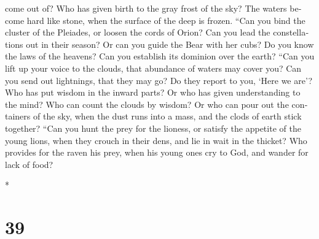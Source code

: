 \begin{paracol}{2}
\begin{otherlanguage}{english}
come out of? Who has given birth to the gray frost of the sky?
 The waters become hard like stone, when the surface of
the deep is frozen.  ``Can you bind the cluster of the
Pleiades, or loosen the cords of Orion?  Can you lead the
constellations out in their season? Or can you guide the Bear with her
cubs?  Do you know the laws of the heavens? Can you
establish its dominion over the earth?  ``Can you lift up
your voice to the clouds, that abundance of waters may cover you?
 Can you send out lightnings, that they may go? Do they
report to you, `Here we are'?  Who has put wisdom in the
inward parts? Or who has given understanding to the mind?
 Who can count the clouds by wisdom? Or who can pour out
the containers of the sky,  when the dust runs into a
mass, and the clods of earth stick together?  ``Can you
hunt the prey for the lioness, or satisfy the appetite of the young
lions,  when they crouch in their dens, and lie in wait
in the thicket?  Who provides for the raven his prey,
when his young ones cry to God, and wander for lack of food?

\end{otherlanguage}

\switchcolumn[0]*

\hypertarget{section-76}{%
\section{39}\label{section-76}}


\end{paracol}
